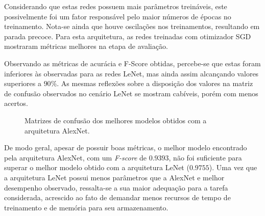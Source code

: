 Considerando que estas redes possuem mais parâmetros treináveis, este possivelmente foi um fator responsável pelo maior números de épocas no treinamento. Nota-se ainda que houve oscilações nos treinamentos, resultando em parada precoce. Para esta arquitetura, as redes treinadas com otimizador SGD mostraram métricas melhores na etapa de avaliação.

Observando as métricas de acurácia e F-Score obtidas, percebe-se que estas foram inferiores às observadas para as redes LeNet, mas ainda assim alcançando valores superiores a $90\%$. As mesmas reflexões sobre a disposição dos valores na matriz de confusão observados no cenário LeNet se mostram cabíveis, porém com menos acertos.

\begin{figure}[H]
 \centering
 \caption{Matrizes de confusão dos melhores modelos obtidos com a arquitetura AlexNet.}
 \hfill
 \label{fig:matrizes-alexnet}
\end{figure}

De modo geral, apesar de possuir boas métricas, o melhor modelo encontrado pela arquitetura AlexNet, com um \emph{F-score} de $0.9393$, não foi suficiente para superar o melhor modelo obtido com a arquitetura LeNet ($0.9755$). Uma vez que a arquitetura LeNet possui menos parâmetros que a AlexNet e melhor desempenho observado, ressalta-se a sua maior adequação para a tarefa considerada, acrescido ao fato de demandar menos recursos de tempo de treinamento e de memória para seu armazenamento.
